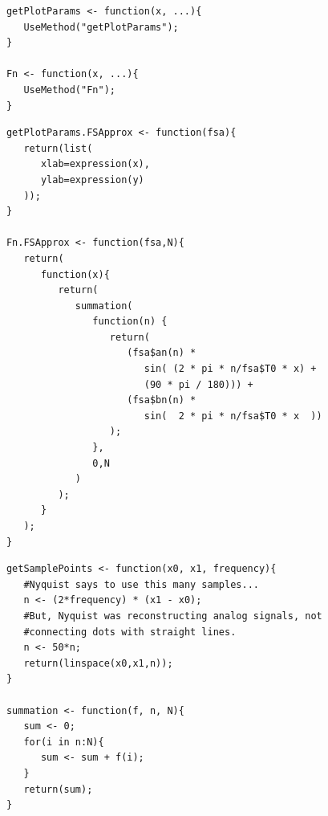 \documentclass{beamer}
\begin{document}
\begin{frame}[fragile]
   \begin{center}
   \begin{minipage}{100mm}
   \begin{lstlisting}
      getPlotParams <- function(x, ...){
         UseMethod("getPlotParams");
      }

      Fn <- function(x, ...){
         UseMethod("Fn");
      }
   \end{lstlisting}
   \end{minipage}
   \end{center}
\end{frame}

\begin{frame}[fragile]
   \begin{center}
   \begin{minipage}{100mm}
   \begin{lstlisting}
      getPlotParams.FSApprox <- function(fsa){
         return(list(
            xlab=expression(x),
            ylab=expression(y)
         ));
      }

      Fn.FSApprox <- function(fsa,N){
         return(
            function(x){
               return(
                  summation(
                     function(n) {
                        return(
                           (fsa$an(n) * 
                              sin( (2 * pi * n/fsa$T0 * x) + 
                              (90 * pi / 180))) +
                           (fsa$bn(n) * 
                              sin(  2 * pi * n/fsa$T0 * x  )) 
                        );
                     }, 
                     0,N
                  )
               );
            }
         );
      }
   \end{lstlisting}
   \end{minipage}
   \end{center}
\end{frame}

\begin{frame}[fragile]
   \begin{center}
   \begin{minipage}{100mm}
   \begin{lstlisting}
      getSamplePoints <- function(x0, x1, frequency){
         #Nyquist says to use this many samples...
         n <- (2*frequency) * (x1 - x0);
         #But, Nyquist was reconstructing analog signals, not 
         #connecting dots with straight lines.
         n <- 50*n;
         return(linspace(x0,x1,n));
      }

      summation <- function(f, n, N){
         sum <- 0;
         for(i in n:N){
            sum <- sum + f(i);
         }
         return(sum);
      }
   \end{lstlisting}
   \end{minipage}
   \end{center}
\end{frame}
\end{document}
